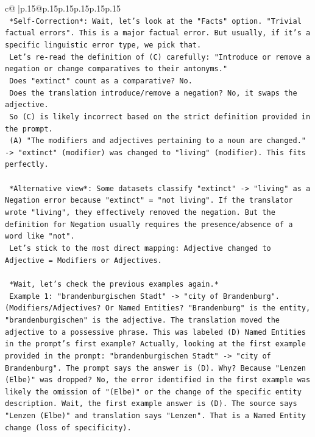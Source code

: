 \documentclass{article}
\begin{document}
{\begin{supertabular}{c@{$\;$}|p{.15\linewidth}@{}p{.15\linewidth}p{.15\linewidth}p{.15\linewidth}p{.15\linewidth}p{.15\linewidth}}
{{{\\ 
\texttt{    *Self{-}Correction*: Wait, let's look at the "Facts" option. "Trivial factual errors". This is a major factual error. But usually, if it's a specific linguistic error type, we pick that.} \\
\texttt{    Let's re{-}read the definition of (C) carefully: "Introduce or remove a negation or change comparatives to their antonyms."} \\
\texttt{    Does "extinct" count as a comparative? No.} \\
\texttt{    Does the translation introduce/remove a negation? No, it swaps the adjective.} \\
\texttt{    So (C) is likely incorrect based on the strict definition provided in the prompt.} \\
\texttt{    (A) "The modifiers and adjectives pertaining to a noun are changed." {-}> "extinct" (modifier) was changed to "living" (modifier). This fits perfectly.} \\
\\ 
\texttt{    *Alternative view*: Some datasets classify "extinct" {-}> "living" as a Negation error because "extinct" = "not living". If the translator wrote "living", they effectively removed the negation. But the definition for Negation usually requires the presence/absence of a word like "not".} \\
\texttt{    Let's stick to the most direct mapping: Adjective changed to Adjective = Modifiers or Adjectives.} \\
\\ 
\texttt{    *Wait, let's check the previous examples again.*} \\
\texttt{    Example 1: "brandenburgischen Stadt" {-}> "city of Brandenburg". (Modifiers/Adjectives? Or Named Entities? "Brandenburg" is the entity, "brandenburgischen" is the adjective. The translation moved the adjective to a possessive phrase. This was labeled (D) Named Entities in the prompt's first example? Actually, looking at the first example provided in the prompt: "brandenburgischen Stadt" {-}> "city of Brandenburg". The prompt says the answer is (D). Why? Because "Lenzen (Elbe)" was dropped? No, the error identified in the first example was likely the omission of "(Elbe)" or the change of the specific entity description. Wait, the first example answer is (D). The source says "Lenzen (Elbe)" and translation says "Lenzen". That is a Named Entity change (loss of specificity).} \\
\\ 
}}}
\end{supertabular}}
\end{document}
